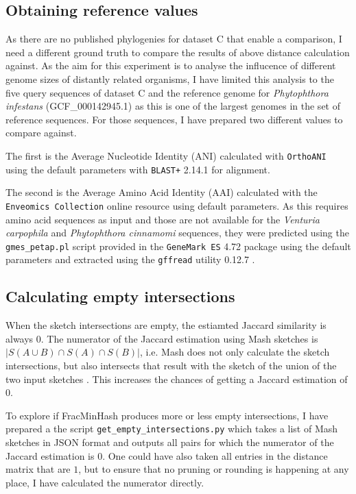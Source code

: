 \subsection*{Obtaining reference values}
As there are no published phylogenies for dataset C that enable a comparison, I
need a different ground truth to compare the results of above distance
calculation against. As the aim for this experiment is to analyse the influcence
of different genome sizes of distantly related organisms, I have limited this
analysis to the five query sequences of dataset C and the reference genome for
\textit{Phytophthora infestans} (GCF\_000142945.1) as this is one of the largest
genomes in the set of reference sequences. For those sequences, I have prepared
two different values to compare against.

The first is the Average Nucleotide Identity (ANI) calculated with
\texttt{OrthoANI} \cite{leeOrthoANIImprovedAlgorithm2016} using the default
parameters with \texttt{BLAST+} 2.14.1
\cite{camachoBLASTArchitectureApplications2009} for alignment.

The second is the Average Amino Acid Identity (AAI)
\cite{konstantinidisGenomeBasedTaxonomyProkaryotes2005} calculated with the
\texttt{Enveomics Collection} online resource
\cite{rodriguez-rEnveomicsCollectionToolbox2016} using default parameters. As
this requires amino acid sequences as input and those are not available for the
\textit{Venturia carpophila} and \textit{Phytophthora cinnamomi} sequences, they
were predicted using the \texttt{gmes\_petap.pl} script provided in the
\texttt{GeneMark ES} 4.72 package \cite{lomsadzeGeneIdentificationNovel2005}
using the default parameters and extracted using the \texttt{gffread} utility
0.12.7 \cite{perteaGFFUtilitiesGffRead2020}.


\subsection*{Calculating empty intersections}
When the sketch intersections are empty, the estiamted Jaccard similarity is
always 0. The numerator of the Jaccard estimation using Mash sketches is $|S(A
\cup B) \cap S(A) \cap S(B)|$, i.e. Mash does not only calculate the sketch
intersections, but also intersects that result with the sketch of the union of
the two input sketches \cite{ondovMashFastGenome2016}. This increases the
chances of getting a Jaccard estimation of 0. 

To explore if FracMinHash produces more or less empty intersections, I have
prepared a the script \texttt{get\_empty\_intersections.py} which takes a list
of Mash sketches in JSON format and outputs all pairs for which the numerator of
the Jaccard estimation is $0$. One could have also taken all entries in the
distance matrix that are $1$, but to ensure that no pruning or rounding is
happening at any place, I have calculated the numerator directly.

